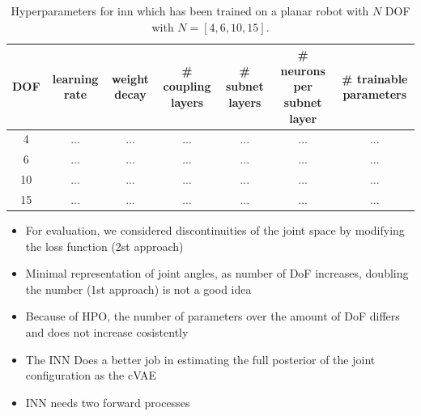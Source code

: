 \documentclass[conference]{IEEEtran}
\begin{document}
\begin{table}[h]
\centering
\begin{tabular}{|c|c|c|c|c|c|c|}
\hline
 DOF & learning rate & weight decay & \# coupling layers & \# subnet layers & \# neurons per subnet layer &  \# trainable parameters\\
 \hline
 4  & ...& ... & ... & ... & ... & ...\\
 6  & ... & ...& ... & ... & ... & ...\\
 10  & ... & ... & ... & ... & ... & ...\\
 15  & ... & ... & ... & ... & ... & ...\\
 \hline
\end{tabular}
\vspace{5pt}
\caption{\label{tab:results:inn}  Hyperparameters for inn which has been trained on a planar robot with $N$ DOF with $N=[4, 6, 10, 15]$.}
\end{table}



\begin{itemize}
	\item For evaluation, we considered discontinuities of the joint space by modifying the loss function (2st approach) 
	\item Minimal representation of joint angles, as number of DoF increases, doubling the number (1st approach) is not a good idea
	\item Because of HPO, the number of parameters over the amount of DoF differs and does not increase cosistently
	\item The INN Does a better job in estimating the full posterior of the joint configuration as the cVAE
	\item INN needs two forward processes
\end{itemize}
\end{document}
